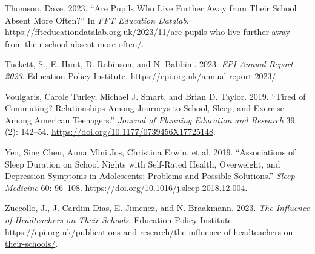 \documentclass[
  12pt,
  titlepage]{article}
\newlength{\cslhangindent}
\newenvironment{CSLReferences}[2] %
 {\begin{list}{}{%
  \setlength{\itemindent}{0pt}
  \setlength{\leftmargin}{0pt}
  \setlength{\parsep}{0pt}
  \ifodd #1
   \setlength{\leftmargin}{\cslhangindent}
   \setlength{\itemindent}{-1\cslhangindent}
  \fi
  \setlength{\itemsep}{#2\baselineskip}}}
 {\end{list}}
\begin{document}
\begin{CSLReferences}{1}{1}
Thomson, Dave. 2023. {``Are Pupils Who Live Further Away from Their
School Absent More Often?''} In \emph{FFT Education Datalab}.
\url{https://ffteducationdatalab.org.uk/2023/11/are-pupils-who-live-further-away-from-their-school-absent-more-often/}.

Tuckett, S., E. Hunt, D. Robinson, and N. Babbini. 2023. \emph{{EPI}
{Annual} {Report} 2023}. Education Policy Institute.
\url{https://epi.org.uk/annual-report-2023/}.

Voulgaris, Carole Turley, Michael J. Smart, and Brian D. Taylor. 2019.
{``Tired of Commuting? {Relationships} Among Journeys to School, Sleep,
and Exercise Among {American} Teenagers.''} \emph{Journal of Planning
Education and Research} 39 (2): 142--54.
\url{https://doi.org/10.1177/0739456X17725148}.

Yeo, Sing Chen, Anna Mini Jos, Christina Erwin, et al. 2019.
{``Associations of Sleep Duration on School Nights with Self-Rated
Health, Overweight, and Depression Symptoms in Adolescents: Problems and
Possible Solutions.''} \emph{Sleep Medicine} 60: 96--108.
\url{https://doi.org/10.1016/j.sleep.2018.12.004}.

Zuccollo, J., J. Cardim Dias, E. Jimenez, and N. Braakmann. 2023.
\emph{The Influence of Headteachers on Their Schools}. Education Policy
Institute.
\url{https://epi.org.uk/publications-and-research/the-influence-of-headteachers-on-their-schools/}.

\end{CSLReferences}
\end{document}
